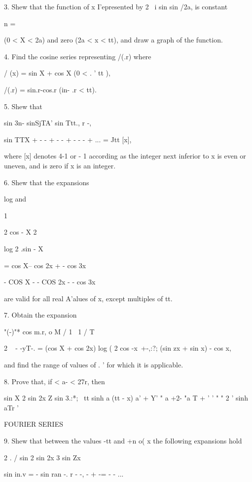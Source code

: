 {3. Shew that the function of x I'epresented by 2 ~i sin sin /2a, is
constant

n = \

(0 < X < 2a) and zero (2a < x < tt), and draw a graph of the function.


4. Find the cosine series representing /(.r) where

/ (x) = sin X + cos X (0 < . ' tt ),

/(.r) = sin.r-cos.r (in- .r < tt). 

5. Shew that

sin 3n- sinSjTA' sin Ttt., r -,

sin TTX + - - + - - + - - - + ... = Jtt [x],

where [x] denotes 4-1 or - 1 according as the integer next inferior to
x is even or uneven, and is zero if x is an integer. 

6. Shew that the expansions

log and

1

2 cos - X 2

log 2 .sin - X

= cos X-- cos 2x + - cos 3x

- COS X - - COS 2x - - cos 3x

are valid for all real A'alues of x, except multiples of tt.

7. Obtain the expansion

"(-)"* cos m.r, o M / 1 \ 1 /  T  \

2 ~ - -yT-. = (cos X + cos 2x) log ( 2 cos -x\ +-,:?; (sin zx + sin x)
- cos x,

and find the range of values of . ' for which it is applicable.

8. Prove that, if < a- < 27r, then

sin X 2 sin 2x Z sin 3.:*; \ tt sinh a (tt - x) a' + Y' " a +2- "a T +
' ' " " 2 ' sinh aTr '


FOURIER SERIES

%
%

9. Shew that between the values -tt and +n o( x the following
expansions hold

2 . / sin 2 sin 2x 3 sin Zx

sin in.v = - sin ran -. r - -, - + -= - - ...

}
